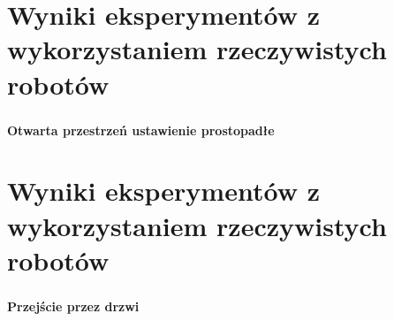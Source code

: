 \section{Wyniki eksperymentów z wykorzystaniem rzeczywistych robotów}
\begin{frame}
\frametitle{\secname}
\framesubtitle{Otwarta przestrzeń ustawienie prostopadłe}
\begin{figure}[ht] %
	\captionsetup[subfigure]{labelformat=empty}
	\centering
\end{figure}
\end{frame}

\section*{Wyniki eksperymentów z wykorzystaniem  rzeczywistych robotów}
\begin{frame}
\frametitle{\secname}
\framesubtitle{Przejście przez drzwi}
\begin{figure}[ht] %
	\captionsetup[subfigure]{labelformat=empty}
	\centering
\end{figure}
\end{frame}